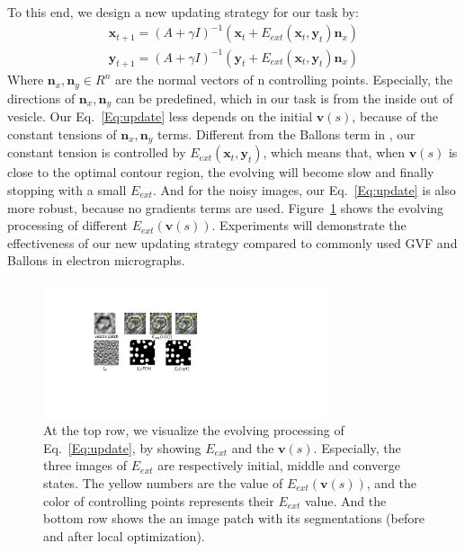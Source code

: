 To this end, we design a new updating strategy for our task by:
\begin{eqnarray}\label{Eq:update}
\mathbf{x}_{t+1} = (A+\gamma I)^{-1}(\mathbf{x}_t+E_{ext}(\mathbf{x}_t,\mathbf{y}_t)\mathbf{n}_x)\\
\mathbf{y}_{t+1} = (A+\gamma I)^{-1}(\mathbf{y}_t+E_{ext}(\mathbf{x}_t,\mathbf{y}_t)\mathbf{n}_x)\nonumber
\end{eqnarray}
Where $\mathbf{n}_x,\mathbf{n}_y\in R^n$ are the normal vectors of n controlling points.
Especially, the directions of $\mathbf{n}_x,\mathbf{n}_y$ can be predefined, which in our task is from the inside out of vesicle.
Our Eq.~\ref{Eq:update} less depends on the initial $\mathbf{v}(s)$, because of the constant tensions of $\mathbf{n}_x,\mathbf{n}_y$ terms.
Different from the Ballons term in \cite{Cohen1991}, our constant tension is controlled by $E_{ext}(\mathbf{x}_t,\mathbf{y}_t)$, which means that, when $\mathbf{v}(s)$ is close to the optimal contour region, the evolving will become slow and finally stopping with a small $E_{ext}$.
And for the noisy images, our Eq.~\ref{Eq:update} is also more robust, because no gradients terms are used.
Figure~\ref{fig:lo} shows the evolving processing of different $E_{ext}(\mathbf{v}(s))$.
Experiments will demonstrate the effectiveness of our new updating strategy compared to commonly used GVF and Ballons in electron micrographs.

\begin{figure}
    \begin{center}
        \includegraphics[width=3.3in]{figs/fig_lo.pdf}
    \end{center}
    \caption{At the top row, we visualize the evolving processing of Eq.~\ref{Eq:update}, by showing $E_{ext}$ and the $\mathbf{v}(s)$. Especially, the three images of $E_{ext}$ are respectively initial, middle and converge states. The yellow numbers are the value of $E_{ext}(\mathbf{v}(s))$, and the color of controlling points represents their $E_{ext}$ value. And the bottom row shows the an image patch with its segmentations (before and after local optimization).}
    \label{fig:lo}
\end{figure}


